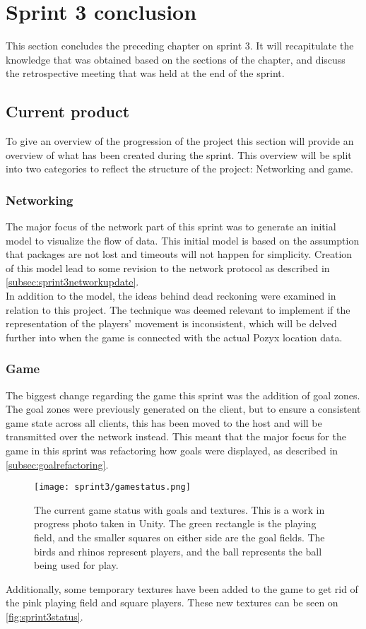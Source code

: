 \section{Sprint 3 conclusion}\label{sec:sprint3conclusion}
This section concludes the preceding chapter on sprint 3.
It will recapitulate the knowledge that was obtained based on the sections of the chapter, and discuss the retrospective meeting that was held at the end of the sprint.

\subsection{Current product}
To give an overview of the progression of the project this section will provide an overview of what has been created during the sprint.
This overview will be split into two categories to reflect the structure of the project: Networking and game.

\subsubsection{Networking}
The major focus of the network part of this sprint was to generate an initial \uppaal model to visualize the flow of data.
This initial model is based on the assumption that packages are not lost and timeouts will not happen for simplicity.
Creation of this model lead to some revision to the network protocol as described in \autoref{subsec:sprint3networkupdate}.\\
In addition to the \uppaal model, the ideas behind dead reckoning were examined in relation to this project.
The technique was deemed relevant to implement if the representation of the players' movement is inconsistent, which will be delved further into when the game is connected with the actual Pozyx location data.

\subsubsection{Game}
The biggest change regarding the game this sprint was the addition of goal zones.
The goal zones were previously generated on the client, but to ensure a consistent game state across all clients, this has been moved to the host and will be transmitted over the network instead.
This meant that the major focus for the game in this sprint was refactoring how goals were displayed, as described in \autoref{subsec:goalrefactoring}.

\begin{figure}[H]
	\centering
	\texttt{[image: sprint3/gamestatus.png]}
	\caption{The current game status with goals and textures. This is a work in progress photo taken in Unity. The green rectangle is the playing field, and the smaller squares on either side are the goal fields. The birds and rhinos represent players, and the ball represents the ball being used for play.}
	\label{fig:sprint3status}
\end{figure}
\noindent
Additionally, some temporary textures have been added to the game to get rid of the pink playing field and square players.
These new textures can be seen on \autoref{fig:sprint3status}.


